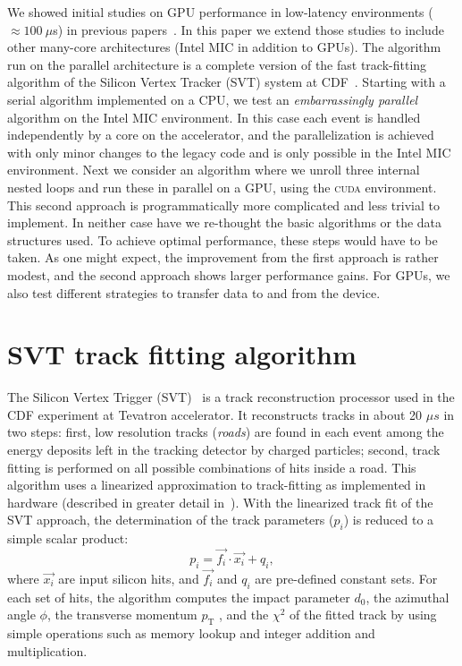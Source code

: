 \documentclass[a4]{jpconf}
\begin{document}
We showed initial studies on GPU performance in low-latency
environments ($\approx 100~\mu$s) in previous
papers~\cite{TIPP2011,NSS2012}.  In this paper we extend those studies
to include other many-core architectures (Intel MIC in addition to
GPUs).  The algorithm run on the parallel architecture is a complete
version of the fast track-fitting algorithm of the Silicon Vertex
Tracker (SVT) system at CDF~\cite{SVT1}.
Starting with a serial algorithm
implemented on a CPU, we test an \textit{embarrassingly parallel}
algorithm on the Intel MIC environment. In this case each event is
handled independently by a core on the accelerator, and the
parallelization is achieved with only minor changes to the legacy code
and is only possible in the Intel MIC environment. Next we consider an
algorithm where we unroll three internal nested loops and run these in
parallel on a GPU, using the \textsc{cuda} environment. This second
approach is programmatically more complicated and less trivial to
implement. In neither case have we re-thought the basic algorithms or
the data structures used. To achieve optimal performance, these steps
would have to be taken.  As one might expect, the improvement from the
first approach is rather modest, and the second approach shows larger
performance gains. For GPUs, we also test different strategies to transfer
data to and from the device.

\section{SVT track fitting algorithm}
The Silicon Vertex Trigger (SVT)~\cite{SVT1,SVT2} is a track
reconstruction processor used in the CDF experiment at Tevatron
accelerator. It reconstructs tracks in about 20 $\mu s$ in two steps:
first, low resolution tracks (\textit{roads}) are found in each event
among the energy deposits left in the tracking detector by charged
particles; second, track fitting is performed on all possible
combinations of hits inside a road.  This algorithm uses a linearized
approximation to track-fitting as implemented in hardware (described
in greater detail in~\cite{SVT3}).  With the linearized track fit of
the SVT approach, the determination of the track parameters ($p_i$) is
reduced to a simple scalar product:
\[
p_i = \vec{f_i} \cdot \vec{x_i} + q_i,
\]
where $\vec{x_i}$ are input silicon hits, and $\vec{f_i}$ and $q_i$ are 
pre-defined constant sets. For each set of hits, the algorithm
computes the impact parameter $d_0$, the azimuthal angle $\phi$, 
the transverse momentum $p_\mathrm{T}$ , and the $\chi^2$ of the
fitted track by using simple operations such as memory lookup and 
integer addition and multiplication.
\end{document}
